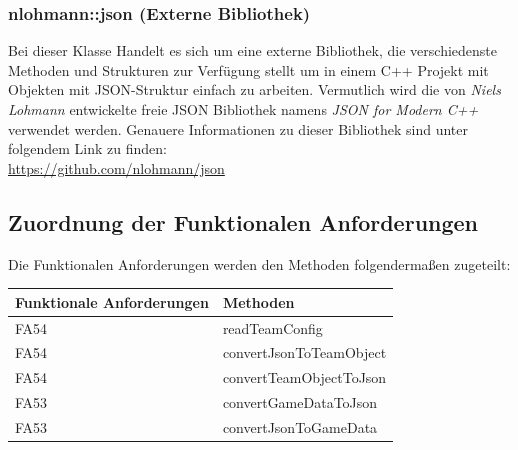     \subsubsection{nlohmann::json (Externe Bibliothek)}
		Bei dieser Klasse Handelt es sich um eine externe Bibliothek, die verschiedenste Methoden und Strukturen zur Verfügung stellt um in einem C++ Projekt mit Objekten mit JSON-Struktur einfach zu arbeiten. Vermutlich wird die von \textit{Niels Lohmann} entwickelte freie JSON Bibliothek namens \textit{JSON for Modern C++} verwendet werden. Genauere Informationen zu dieser Bibliothek sind unter folgendem Link zu finden: \\ \url{https://github.com/nlohmann/json}

\newpage

\subsection{Zuordnung der Funktionalen Anforderungen}

Die Funktionalen Anforderungen werden den Methoden folgendermaßen zugeteilt:


\begin{table}[h]
	\centering
	\begin{tabular}{|l|l|}
    	\hline
    	\textbf{Funktionale Anforderungen} & \textbf{Methoden} \\ \hline
    	FA54 & readTeamConfig \\ \hline
    	FA54 & convertJsonToTeamObject \\ \hline
    	FA54 & convertTeamObjectToJson \\ \hline
    	FA53 & convertGameDataToJson \\ \hline
    	FA53 & convertJsonToGameData \\ \hline

	\end{tabular}
\end{table}